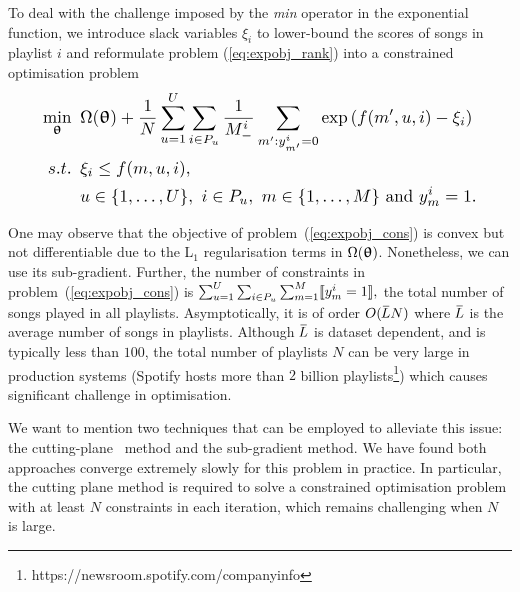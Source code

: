 To deal with the challenge imposed by the \emph{min} operator in the exponential function, 
we introduce slack variables $\xi_i$ to lower-bound the scores of songs in playlist $i$ %
and 
reformulate problem (\ref{eq:expobj_rank}) into a constrained optimisation problem %
\begin{equation}
\label{eq:expobj_cons}
\resizebox{.9\linewidth}{!}{$\displaystyle
\begin{aligned}
\min_{\upthetabm} \ \, & 
\Omega(\upthetabm) + \frac{1}{N} \sum_{u=1}^U \sum_{i \in P_u} \frac{1}{M_-^i} \sum_{m': y_{m'}^i = 0} \exp \left( f(m', u, i) - \xi_i \right) \\
s.t. \ \, & 
\xi_i \le f(m, u, i), \\
& u \in \{1,\dots,U\}, \ i \in P_u, \ m \in \{1,\dots,M\} \ \text{and} \ y_m^i = 1.
\end{aligned}
$}
\end{equation}

One may observe that the objective of problem~(\ref{eq:expobj_cons}) is convex but not differentiable due to 
the L$_1$ regularisation terms in $\Omega({\bm{\uptheta}})$.
Nonetheless, we can use its sub-gradient.
Further, the number of constraints in problem~(\ref{eq:expobj_cons}) is
$
\sum_{u=1}^U \sum_{i \in P_u} \sum_{m=1}^M \llbracket y_m^i = 1 \rrbracket,
$
\ie the total number of songs played in all playlists.
Asymptotically, it is of order $O(\widebar{L} N)$ where $\widebar{L}$ is the average number of songs in playlists.
Although $\widebar{L}$ is dataset dependent, and is typically less than $100$,
the total number of playlists $N$ can be very large in production systems 
(\eg Spotify hosts more than $2$ billion playlists\footnote{https://newsroom.spotify.com/companyinfo})
which causes significant challenge in optimisation. 

We want to mention two techniques that can be employed to alleviate this issue:
the cutting-plane~\cite{avriel2003nonlinear} method and the sub-gradient method.
We have found both approaches converge extremely slowly for this problem in practice.
In particular, the cutting plane method is required to solve %
a constrained optimisation problem with at least $N$ constraints in each iteration, 
which remains challenging when $N$ is large.

